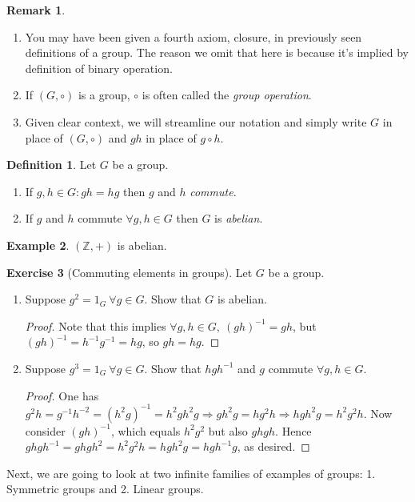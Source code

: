 \documentclass[a4paper]{article}
\newcommand{\Z}{\mathbb{Z}}
\theoremstyle{definition}
\newtheorem{defn}{Definition}[subsection]
\newtheorem{example}[defn]{Example}
\newtheorem{exe}[defn]{Exercise}
\newtheorem*{remark}{Remark}
\begin{document}
\begin{remark}
\begin{enumerate}
\item You may have been given a fourth axiom, closure, in previously seen definitions of a group. The reason we omit that here is because it's implied by definition of binary operation.
\item If $(G,\circ)$ is a group, $\circ$ is often called the \textit{group operation}.
\item Given clear context, we will streamline our notation and simply write $G$ in place of $(G,\circ)$ and $gh$ in place of $g\circ h$.
\end{enumerate}
\end{remark}

\begin{defn}
Let $G$ be a group.
\begin{enumerate}
\item If $g,h\in G : gh=hg$ then $g$ and $h$ \textit{commute}.
\item If $g$ and $h$ commute $\forall g,h \in G$ then $G$ is \textit{abelian}.
\end{enumerate}
\end{defn}

\begin{example}
$(\Z,+)$ is abelian.
\end{example}

\begin{exe}[Commuting elements in groups]
Let $G$ be a group.
\begin{enumerate}
\item Suppose $g^2=1_G \ \forall g\in G$. Show that $G$ is abelian.
\begin{proof}
Note that this implies $\forall g,h\in G,\ (gh)^{-1}=gh$, but $(gh)^{-1}=h^{-1}g^{-1}=hg$, so $gh=hg$.
\end{proof}
\item Suppose $g^3=1_G \ \forall g\in G$. Show that $hgh^{-1}$ and $g$ commute $\forall g,h\in G$.
\begin{proof}
One has $g^2h=g^{-1}h^{-2}=(h^2g)^{-1}=h^2gh^2g\Rightarrow gh^2g=hg^2h\Rightarrow  hgh^2g=h^2g^2h$. Now consider $(gh)^{-1}$, which equals $h^2g^2$ but also $ghgh$. Hence $ghgh^{-1}=ghgh^2=h^2g^2h=hgh^2g=hgh^{-1}g$, as desired.
\end{proof}
\end{enumerate}
\end{exe}

Next, we are going to look at two infinite families of examples of groups: 1. Symmetric groups and 2. Linear groups.
\end{document}
